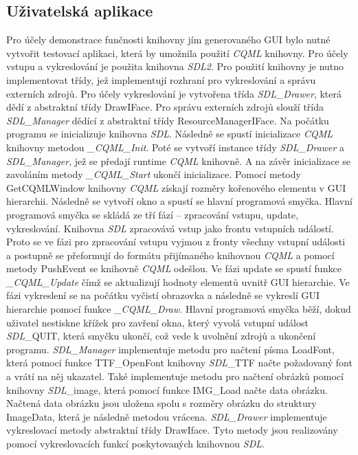\documentclass[11pt,twoside,a4paper]{book}
\begin{document}
{{\begin{ttemize}
{{\begin{lastlisting}[frame=single,caption=Řešení v pseudokódu problematického použití operátoru "." v přiřazovacím výroku,label=lst:var0N]
\section{Uživatelská aplikace}
Pro účely demonstrace funčnosti knihovny jím generovaného GUI bylo nutné vytvořit testovací aplikaci, která by umožnila použití \textit{CQML} knihovny.
Pro účely vstupu a vykreslování je použita knihovna \textit{SDL2}. Pro použití knihovny je nutno implementovat třídy, jež implementují rozhraní pro vykreslování a správu externích zdrojů. Pro účely vykreslování je vytvořena třída \textit{SDL\_Drawer}, která dědí z abstraktní třídy DrawIFace. Pro správu externích zdrojů slouží třída \textit{SDL\_Manager} dědící z abstraktní třídy ResourceManagerIFace.
Na počátku programu se inicializuje knihovna \textit{SDL}. Následně se spustí inicializace \textit{CQML} knihovny metodou \textit{\_CQML\_Init}. Poté se vytvoří instance třídy \textit{SDL\_Drawer} a \textit{SDL\_Manager}, jež se předají runtime \textit{CQML} knihovně. A na závěr inicializace se zavoláním metody \textit{\_CQML\_Start} ukončí inicializace. Pomocí metody GetCQMLWindow knihovny \textit{CQML} získají rozměry kořenového elementu v GUI hierarchii.
Následně se vytvoří okno a spustí se hlavní programová smyčka. Hlavní programová smyčka se skládá ze tří fází – zpracování vstupu, update, vykreslování.
Knihovna \textit{SDL} zpracovává vstup jako frontu vstupních událostí. Proto se ve fázi pro zpracování vstupu vyjmou z fronty všechny vstupní události a postupně se přeformují do formátu přijímaného knihovnou \textit{CQML} a pomocí metody PushEvent se knihovně \textit{CQML} odešlou. Ve fázi update se spustí funkce \textit{\_CQML\_Update} čímž se aktualizují hodnoty elementů uvnitř GUI hierarchie. Ve fázi vykreslení se na počátku vyčistí obrazovka a následně se vykreslí GUI hierarchie pomocí funkce \textit{\_CQML\_Draw}. Hlavní programová smyčka běží, dokud uživatel nestiskne křížek pro zavření okna, který vyvolá vstupní událost \textit{SDL}_QUIT, která smyčku ukončí, což vede k uvolnění zdrojů a ukončení programu.
\textit{SDL_Manager} implementuje metodu pro načtení písma LoadFont, která pomocí funkce TTF_OpenFont knihovny \textit{SDL}_TTF načte požadovaný font a vrátí na něj ukazatel. Také implementuje metodu pro načtení obrázků pomocí knihovny \textit{SDL}_image, která pomocí funkce IMG_Load načte data obrázku. Načtená data obrázku jsou uložena spolu s rozměry obrázku do struktury ImageData, která je následně metodou vrácena. 
\textit{SDL_Drawer} implementuje vykreslovací metody abstraktní třídy DrawIface. Tyto metody jsou realizovány pomocí vykreslovacích funkcí poskytovaných knihovnou \textit{SDL}.


\end{lastlisting}}}
\end{ttemize}}}
\end{document}
